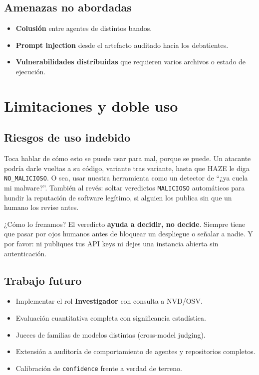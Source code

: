 \documentclass[10pt]{article}
\begin{document}
\subsection{Amenazas no abordadas}

\begin{itemize}[leftmargin=*]
  \item \textbf{Colusión} entre agentes de distintos bandos.
  \item \textbf{Prompt injection} desde el artefacto auditado hacia los debatientes.
  \item \textbf{Vulnerabilidades distribuidas} que requieren varios archivos o estado de
  ejecución.
\end{itemize}

\section{Limitaciones y doble uso}

\subsection{Riesgos de uso indebido}

Toca hablar de cómo esto se puede usar para mal, porque se puede. Un atacante podría
darle vueltas a su código, variante tras variante, hasta que HAZE le diga
\texttt{NO\_MALICIOSO}. O sea, usar nuestra herramienta como un detector de ``¿ya cuela
mi malware?''. También al revés: soltar veredictos \texttt{MALICIOSO} automáticos para
hundir la reputación de software legítimo, si alguien los publica sin que un humano los
revise antes.

¿Cómo lo frenamos? El veredicto \textbf{ayuda a decidir, no decide}. Siempre tiene que
pasar por ojos humanos antes de bloquear un despliegue o señalar a nadie. Y por favor: ni
publiques tus API keys ni dejes una instancia abierta sin autenticación.

\subsection{Trabajo futuro}

\begin{itemize}[leftmargin=*]
  \item Implementar el rol \textbf{Investigador} con consulta a NVD/OSV.
  \item Evaluación cuantitativa completa con significancia estadística.
  \item Jueces de familias de modelos distintas (cross-model judging).
  \item Extensión a auditoría de comportamiento de agentes y repositorios completos.
  \item Calibración de \texttt{confidence} frente a verdad de terreno.
\end{itemize}
\end{document}
